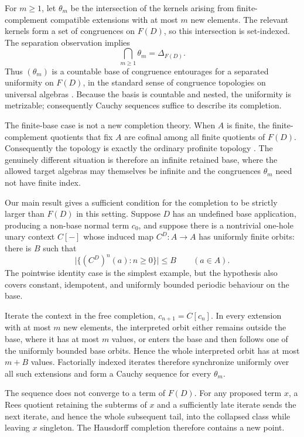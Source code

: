 For $m\ge1$, let $\theta_m$ be the intersection of the kernels arising from
finite-complement compatible extensions with at most $m$ new elements.  The
relevant kernels form a set of congruences on $F(D)$, so this intersection is
set-indexed.  The separation observation implies
\[
 \bigcap_{m\ge1}\theta_m=\Delta_{F(D)}.
\]
Thus $(\theta_m)$ is a countable base of congruence entourages for a separated
uniformity on $F(D)$, in the standard sense of congruence topologies on
universal algebras \cite{BulmanFleming1971}.  Because the basis is countable and
nested, the uniformity is metrizable; consequently Cauchy sequences suffice to
describe its completion.

The finite-base case is not a new completion theory.  When $A$ is finite, the
finite-complement quotients that fix $A$ are cofinal among all finite quotients
of $F(D)$.  Consequently the topology is exactly the ordinary profinite
topology \cite{DaveyGouveiaHaviarPriestley2011,ChenAdamekMiliusUrbat2016}.
The genuinely different situation is therefore an infinite retained base,
where the allowed target algebras may themselves be infinite and the
congruences $\theta_m$ need not have finite index.

Our main result gives a sufficient condition for the completion to be strictly
larger than $F(D)$ in this setting.  Suppose $D$ has an undefined base
application, producing a non-base normal term $c_0$, and suppose there is a
nontrivial one-hole unary context $C[-]$ whose induced map $C^D:A\to A$ has
uniformly finite orbits: there is $B$ such that
\[
 \bigl|\{(C^D)^n(a):n\ge0\}\bigr|\le B
 \qquad(a\in A).
\]
The pointwise identity case is the simplest example, but the hypothesis also
covers constant, idempotent, and uniformly bounded periodic behaviour on the
base.

Iterate the context in the free completion, $c_{n+1}=C[c_n]$.  In every
extension with at most $m$ new elements, the interpreted orbit either remains
outside the base, where it has at most $m$ values, or enters the base and then
follows one of the uniformly bounded base orbits.  Hence the whole interpreted
orbit has at most $m+B$ values.  Factorially indexed iterates therefore
synchronize uniformly over all such extensions and form a Cauchy sequence for
every $\theta_m$.

The sequence does not converge to a term of $F(D)$.  For any proposed term
$x$, a Rees quotient retaining the subterms of $x$ and a sufficiently late
iterate sends the next iterate, and hence the whole subsequent tail, into the
collapsed class while leaving $x$ singleton.  The Hausdorff completion
therefore contains a new point.

